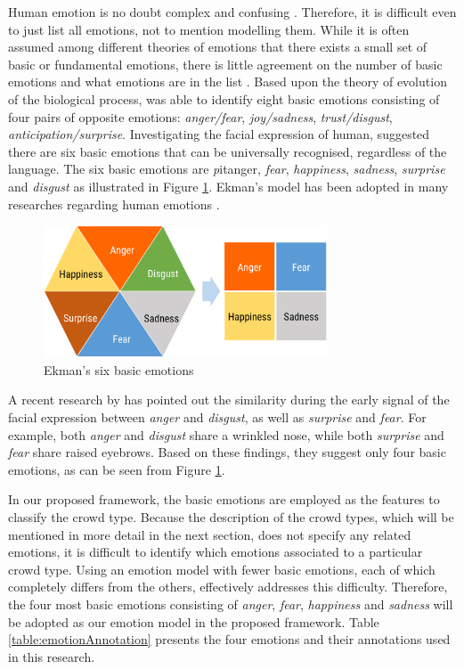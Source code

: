 Human emotion is no doubt complex and confusing \citep{plutchik2001nature}. Therefore, it is difficult even to just list all emotions, not to mention modelling them. While it is often assumed among different theories of emotions that there exists a small set of basic or fundamental emotions, there is little agreement on the number of basic emotions and what emotions are in the list \citep{Ortony1990}. Based upon the theory of evolution of the biological process, \citet{plutchik2001integration} was able to identify eight basic emotions consisting of four pairs of opposite emotions: \textit{anger/fear}, \textit{joy/sadness}, \textit{trust/disgust}, \textit{anticipation/surprise}. Investigating the facial expression of human, \citet{ekman1971constants} suggested there are six basic emotions that can be universally recognised, regardless of the language. The six basic emotions are \textit pit{anger}, \textit{fear}, \textit{happiness}, \textit{sadness}, \textit{surprise} and \textit{disgust} as illustrated in Figure \ref{fig:emotionModel}. Ekman's model has been adopted in many researches regarding human emotions \citep{mohammad2014using, roberts2012empatweet, alm2005emotions}. 

\begin{figure}[htb!]
\centering    
\includegraphics[width=0.75\textwidth]{EkmanModel}
\caption{Ekman's six basic emotions}
\label{fig:emotionModel}
\end{figure}

A recent research by \cite{Jack2014} has pointed out the similarity during the early signal of the facial expression between \textit{anger} and \textit{disgust}, as well as \textit{surprise} and \textit{fear}. For example, both \textit{anger} and \textit{disgust} share a wrinkled nose, while both \textit{surprise} and \textit{fear} share raised eyebrows. Based on these findings, they suggest only four basic emotions, as can be seen from Figure \ref{fig:emotionModel}.

In our proposed framework, the basic emotions are employed as the features to classify the crowd type. Because the description of the crowd types, which will be mentioned in more detail in the next section, does not specify any related emotions, it is difficult to identify which emotions associated to a particular crowd type. Using an emotion model with fewer basic emotions, each of which completely differs from the others, effectively addresses this difficulty. Therefore, the four most basic emotions consisting of \textit{anger}, \textit{fear}, \textit{happiness} and \textit{sadness} will be adopted as our emotion model in the proposed framework. Table \ref{table:emotionAnnotation} presents the four emotions and their annotations used in this research.

